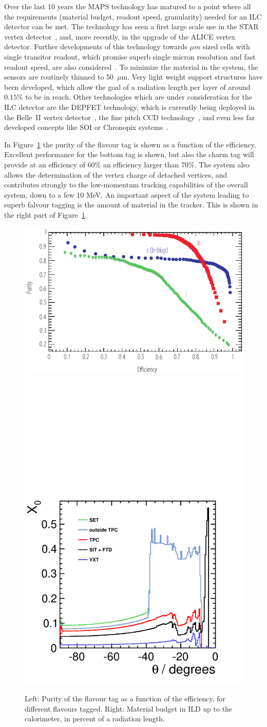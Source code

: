 \documentclass[%
 amsmath,amssymb,
 aps,
]{revtex4-1}
\begin{document}
Over the last 10 years the MAPS technology has matured to a point where all the requirements (material budget, readout speed, granularity) needed for an ILC detector can be met. The technology has seen a first large scale use in the STAR vertex detector~\cite{ild:bib:VTXcps3}, and, more recently, in the upgrade of the ALICE vertex detector. Further developments of this technology towards $\mu m$ sized cells with single transitor readout, which promise superb single micron resolution and fast readout speed, are also considered~\cite{Fourches:2017}. To minimize the material in the system, the sensors are routinely thinned to 50~$\mu{\mathrm m}$. Very light weight support structures have been developed, which allow the goal of a radiation length per layer of around $0.15 \%$ to be in reach. 
Other technologies which are under consideration for the ILC detector are the DEPFET technology, which is currently being deployed in the Belle~II vertex detector~\cite{Luetticke:2017zpx}, the fine pitch CCD technology~\cite{fineCCD}, and even less far developed concepts like SOI or Chronopix systems~\cite{RDliaision}. 

In Figure~\ref{fig-btag} the purity of the flavour tag is shown as a function of the efficiency. Excellent performance for the bottom tag is shown, but also the charm tag will provide at an efficiency of 60\% an efficiency larger than 70\%. The system also allows the determination of the vertex charge of detached vertices, and contributes strongly to the low-momentum tracking capabilities of the overall system, down to a few 10 MeV. An important aspect of the system leading to superb falvour tagging is the amount of material in the tracker. This is shown in the right part of Figure~\ref{fig-btag}.
\begin{figure}
    \centering
    \includegraphics[width=0.45\hsize]{figures/FlavourTagPurities_Zpeak_DCR-eps-converted-to.pdf}
    \includegraphics[width=0.35\hsize]{figures/material-budget-new.pdf}
    \caption{Left: Purity of the flavour tag as a function of the efficiency, for different flavours tagged. Right: Material budget in ILD up to the calorimeter, in percent of a radiation length.}
    \label{fig-btag}
\end{figure}  
\end{document}
